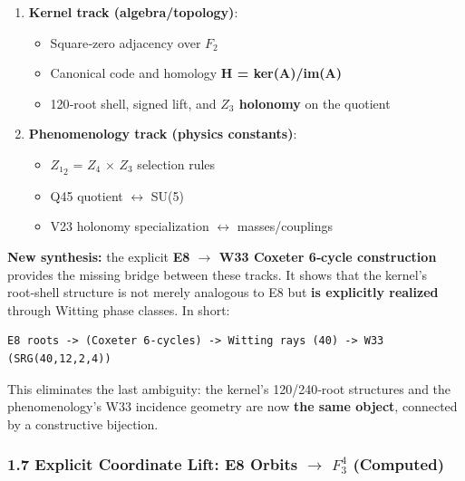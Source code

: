 \documentclass[11pt]{article}
\providecommand{\tightlist}{%
  \setlength{\itemsep}{0pt}\setlength{\parskip}{0pt}}
\begin{document}
\begin{enumerate}
\def\labelenumi{\arabic{enumi}.}
\tightlist
\item
  \textbf{Kernel track (algebra/topology)}:

  \begin{itemize}
  \tightlist
  \item
    Square‑zero adjacency over \textbf{\(F_{2}\)}\\
  \item
    Canonical code and homology \textbf{H = ker(A)/im(A)}\\
  \item
    120‑root shell, signed lift, and \textbf{\(Z_{3}\) holonomy} on the
    quotient\\
  \end{itemize}
\item
  \textbf{Phenomenology track (physics constants)}:

  \begin{itemize}
  \tightlist
  \item
    \(Z₁_{2}\) = \(Z_{4}\) \ensuremath{\times} \(Z_{3}\) selection
    rules\\
  \item
    Q45 quotient \ensuremath{\leftrightarrow} SU(5)\\
  \item
    V23 holonomy specialization \ensuremath{\leftrightarrow}
    masses/couplings
  \end{itemize}
\end{enumerate}

\textbf{New synthesis:} the explicit \textbf{E8 \ensuremath{\rightarrow}
W33 Coxeter 6‑cycle construction} provides the missing bridge between
these tracks. It shows that the kernel's root‑shell structure is not
merely analogous to E8 but \textbf{is explicitly realized} through
Witting phase classes. In short:

\begin{verbatim}
E8 roots -> (Coxeter 6‑cycles) -> Witting rays (40) -> W33 (SRG(40,12,2,4))
\end{verbatim}

This eliminates the last ambiguity: the kernel's 120/240‑root structures
and the phenomenology's W33 incidence geometry are now \textbf{the same
object}, connected by a constructive bijection.

\subsubsection{\texorpdfstring{1.7 Explicit Coordinate Lift: E8 Orbits
\ensuremath{\rightarrow} \(F_{3}^{4}\)
(Computed)}{1.7 Explicit Coordinate Lift: E8 Orbits  F\_\{3\}\^{}\{4\} (Computed)}}\label{explicit-coordinate-lift-e8-orbits-f_34-computed}
\end{document}
